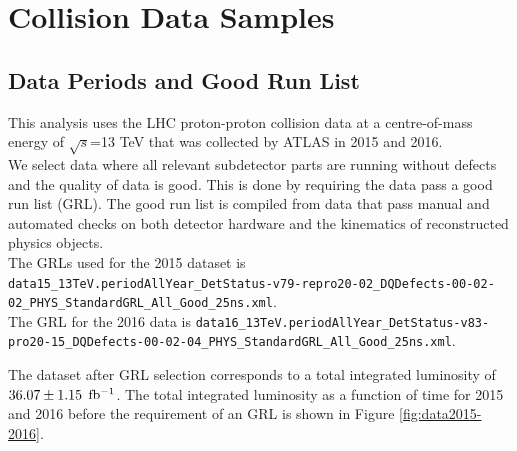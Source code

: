 \chapter{Collision Data Samples}
\label{chap:data}
\section{Data Periods and Good Run List}
\label{EventSel:GRL}

\indent This analysis uses the LHC proton-proton collision data at a centre-of-mass energy of $\sqrt{s}$=13 TeV that was collected by ATLAS in 2015 and 2016. \\

\indent We select data where all relevant subdetector parts are running without defects and the quality of data is good.  This is done by requiring the data pass a good run list (GRL).  The good run list is compiled from data that pass manual and automated checks on both detector hardware and the kinematics of reconstructed physics objects.  \\

\indent The GRLs used for the 2015 dataset is {\tt \scriptsize data15\_13TeV.periodAllYear\_DetStatus-v79-repro20-02\_DQDefects-00-02-02\_PHYS\_StandardGRL\_All\_Good\_25ns.xml}.  \\
\indent The GRL for the 2016 data is {\tt \scriptsize data16\_13TeV.periodAllYear\_DetStatus-v83-pro20-15\_DQDefects-00-02-04\_PHYS\_StandardGRL\_All\_Good\_25ns.xml}.

\indent The dataset after GRL selection corresponds to a total integrated luminosity of $36.07 \pm 1.15$ $\mbox{fb$^{-1}$}$.  The total integrated luminosity as a function of time for 2015 and 2016 before the requirement of an GRL is shown in Figure \ref{fig:data2015-2016}.\\

